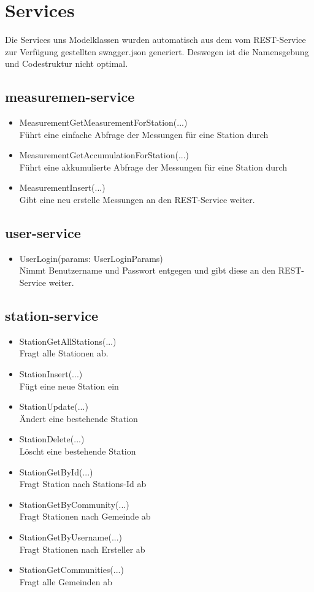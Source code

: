\documentclass[10pt,a4paper,margin=0pt]{scrartcl}
\begin{document}
\section{Services}
Die Services uns Modelklassen wurden automatisch aus dem vom REST-Service zur Verfügung gestellten swagger.json generiert. Deswegen ist die Namensgebung und Codestruktur nicht optimal.
\subsection{measuremen-service}
\begin{itemize}
	\item MeasurementGetMeasurementForStation(...)\\
	Führt eine einfache Abfrage der Messungen für eine Station durch
	\item MeasurementGetAccumulationForStation(...)\\
	Führt eine akkumulierte Abfrage der Messungen für eine Station durch
	\item MeasurementInsert(...)\\
	Gibt eine neu erstelle Messungen an den REST-Service weiter.
\end{itemize}
\subsection{user-service}
\begin{itemize}
	\item UserLogin(params: UserLoginParams)\\
	Nimmt Benutzername und Passwort entgegen und gibt diese an den REST-Service weiter.
\end{itemize}
\pagebreak
\subsection{station-service}
\begin{itemize}
	\item StationGetAllStations(...)\\
	Fragt alle Stationen ab.
	\item StationInsert(...)\\
	Fügt eine neue Station ein
	\item StationUpdate(...)\\
	Ändert eine bestehende Station
	\item StationDelete(...)\\
	Löscht eine bestehende Station
	\item StationGetById(...)\\
	Fragt Station nach Stations-Id ab
	\item StationGetByCommunity(...)\\
	Fragt Stationen nach Gemeinde ab
	\item StationGetByUsername(...)\\
	Fragt Stationen nach Ersteller ab
	\item StationGetCommunities(...)\\
	Fragt alle Gemeinden ab 
\end{itemize}
\end{document}
